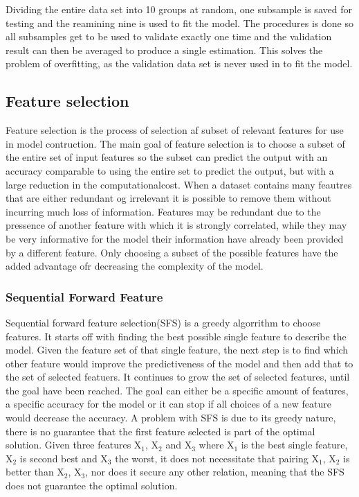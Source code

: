 Dividing the entire data set into 10 groups at random, one subsample is saved for testing and the reamining nine is used to fit the model. The procedures is done so all subsamples get to be used to validate exactly one time and the validation result can then be averaged to produce a single estimation. This solves the problem of overfitting, as the validation data set is never used in to fit the model.

\subsection{Feature selection}
Feature selection is the process of selection af subset of relevant features for use in model contruction.
The main goal of feature selection is to choose a subset of the entire set of input features so the subset can predict the output with an accuracy comparable to using the entire set to predict the output, but with a large reduction in the computationalcost.
When a dataset contains many feautres that are either redundant og irrelevant it is possible to remove them without incurring much loss of information. Features may be redundant due to the pressence of another feature with which it is strongly correlated, while they may be very informative for the model their information have already been provided by a different feature. Only choosing a subset of the possible features have the added advantage ofr decreasing the complexity of the model.

\subsubsection{Sequential Forward Feature}
Sequential forward feature selection(SFS) is a greedy algorrithm to choose features.
It starts off with finding the best possible single feature to describe the model. Given the feature set of that single feature, the next step is to find which other feature would improve the predictiveness of the model and then add that to the set of selected featuers. It continues to grow the set of selected features, until the goal have been reached. The goal can either be a specific amount of features, a specific accuracy for the model or it can stop if all choices of a new feature would decrease the accuracy.
A problem with SFS is due to its greedy nature, there is no guarantee that the first feature selected is part of the optimal solution. Given three features X$_1$, X$_2$ and X$_3$ where X$_1$ is the best single feature, X$_2$ is second best and X$_3$ the worst, it does not necessitate that pairing {X$_1$, X$_2$ } is better than {X$_2$, X$_3$}, nor does it secure any other relation, meaning that the SFS does not guarantee the optimal solution.

